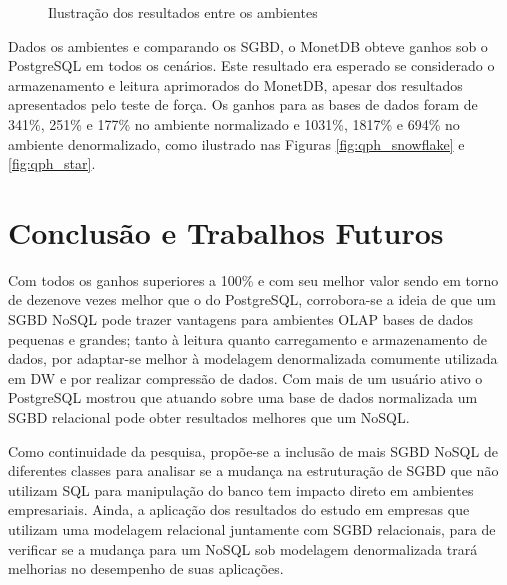 \documentclass[12pt]{article}
\begin{document}
\begin{figure}[htpb]
    \centering
    \caption{Ilustração dos resultados entre os ambientes}\label{fig:qph_ambiente}
\end{figure}

Dados os ambientes e comparando os SGBD, o MonetDB obteve ganhos sob o PostgreSQL 
em todos os cenários. Este resultado era esperado se considerado o armazenamento 
e leitura aprimorados do MonetDB, apesar dos resultados apresentados pelo teste de força. 
Os ganhos para as bases de dados foram de 341\%, 251\% e 177\% no ambiente 
normalizado e 1031\%, 1817\% e 694\% no ambiente denormalizado, como ilustrado 
nas Figuras \ref{fig:qph_snowflake} e \ref{fig:qph_star}.

\section{Conclusão e Trabalhos Futuros}

Com todos os ganhos superiores a 100\% e 
com seu melhor valor sendo em torno de dezenove vezes melhor que o do PostgreSQL, 
corrobora-se a ideia de que um SGBD NoSQL pode trazer vantagens para ambientes OLAP 
bases de dados pequenas e grandes; 
tanto à leitura quanto carregamento e armazenamento de dados,  
por adaptar-se melhor à modelagem denormalizada comumente utilizada em DW e 
por realizar compressão de dados. 
Com mais de um usuário ativo o PostgreSQL mostrou que 
atuando sobre uma base de dados normalizada um SGBD relacional pode obter resultados 
melhores que um NoSQL. 

Como continuidade da pesquisa, propõe-se a inclusão de mais SGBD NoSQL de 
diferentes classes para analisar se a mudança na estruturação de SGBD 
que não utilizam SQL para manipulação do banco tem impacto direto em ambientes empresariais. 
Ainda, a aplicação dos resultados do estudo em 
empresas que utilizam uma modelagem relacional juntamente com SGBD relacionais, para 
de verificar se a mudança para um NoSQL sob modelagem denormalizada trará melhorias no desempenho 
de suas aplicações.



\end{document}
